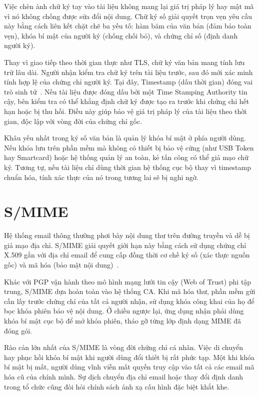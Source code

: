 Việc chèn ảnh chữ ký tay vào tài liệu không mang lại giá trị pháp lý hay mật mã vì nó không chống được sửa đổi nội dung. Chữ ký số giải quyết trọn vẹn yêu cầu này bằng cách liên kết chặt chẽ ba yếu tố: hàm băm của văn bản (đảm bảo toàn vẹn), khóa bí mật của người ký (chống chối bỏ), và chứng chỉ số (định danh người ký).

Thay vì giao tiếp theo thời gian thực như TLS, chữ ký văn bản mang tính lưu trữ lâu dài. Người nhận kiểm tra chữ ký trên tài liệu trước, sau đó mới xác minh tính hợp lệ của chứng chỉ người ký. Tại đây, Timestamp (dấu thời gian) đóng vai trò sinh tử~\cite{RFC3161}. Nếu tài liệu được đóng dấu bởi một Time Stamping Authority tin cậy, bên kiểm tra có thể khẳng định chữ ký được tạo ra trước khi chứng chỉ hết hạn hoặc bị thu hồi. Điều này giúp bảo vệ giá trị pháp lý của tài liệu theo thời gian, độc lập với vòng đời của chứng chỉ gốc.

Khâu yếu nhất trong ký số văn bản là quản lý khóa bí mật ở phía người dùng. Nếu khóa lưu trên phần mềm mà không có thiết bị bảo vệ cứng (như USB Token hay Smartcard) hoặc hệ thống quản lý an toàn, kẻ tấn công có thể giả mạo chữ ký. Tương tự, nếu tài liệu chỉ dùng thời gian hệ thống cục bộ thay vì timestamp chuẩn hóa, tính xác thực của nó trong tương lai sẽ bị nghi ngờ.

\section{S/MIME}
\label{sec:5.3}

Hệ thống email thông thường phơi bày nội dung thư trên đường truyền và dễ bị giả mạo địa chỉ. S/MIME giải quyết giới hạn này bằng cách sử dụng chứng chỉ X.509 gắn với địa chỉ email để cung cấp đồng thời cơ chế ký số (xác thực nguồn gốc) và mã hóa (bảo mật nội dung)~\cite{RFC8551}.

Khác với PGP vận hành theo mô hình mạng lưới tin cậy (Web of Trust) phi tập trung, S/MIME dựa hoàn toàn vào hệ thống CA. Khi mã hóa thư, phần mềm gửi cần lấy trước chứng chỉ của tất cả người nhận, sử dụng khóa công khai của họ để bọc khóa phiên bảo vệ nội dung. Ở chiều ngược lại, ứng dụng nhận phải dùng khóa bí mật cục bộ để mở khóa phiên, tháo gỡ từng lớp định dạng MIME đã đóng gói.

Rào cản lớn nhất của S/MIME là vòng đời chứng chỉ cá nhân. Việc di chuyển hay phục hồi khóa bí mật khi người dùng đổi thiết bị rất phức tạp. Một khi khóa bí mật bị mất, người dùng vĩnh viễn mất quyền truy cập vào tất cả các email mã hóa cũ của chính mình. Sự dịch chuyển địa chỉ email hoặc thay đổi định danh trong tổ chức cũng đòi hỏi chính sách ánh xạ cấu hình đặc biệt khắt khe.

